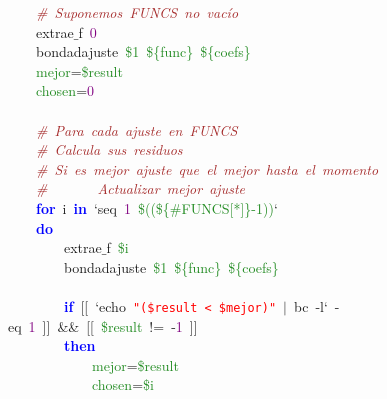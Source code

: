 \mbox{}\ \ \ \ \textit{\textcolor{Brown}{\#\ Suponemos\ FUNCS\ no\ vacío}} \\
\mbox{}\ \ \ \ extrae$\_$f\ \textcolor{Purple}{0} \\
\mbox{}\ \ \ \ bondadajuste\ \textcolor{ForestGreen}{\$1}\ \textcolor{ForestGreen}{\$\{func\}}\ \textcolor{ForestGreen}{\$\{coefs\}} \\
\mbox{}\ \ \ \ \textcolor{ForestGreen}{mejor}\textcolor{BrickRed}{=}\textcolor{ForestGreen}{\$result} \\
\mbox{}\ \ \ \ \textcolor{ForestGreen}{chosen}\textcolor{BrickRed}{=}\textcolor{Purple}{0} \\
\mbox{}\ \ \ \  \\
\mbox{}\ \ \ \ \textit{\textcolor{Brown}{\#\ Para\ cada\ ajuste\ en\ FUNCS}} \\
\mbox{}\ \ \ \ \textit{\textcolor{Brown}{\#\ Calcula\ sus\ residuos}} \\
\mbox{}\ \ \ \ \textit{\textcolor{Brown}{\#\ Si\ es\ mejor\ ajuste\ que\ el\ mejor\ hasta\ el\ momento}} \\
\mbox{}\ \ \ \ \textit{\textcolor{Brown}{\#\ \ \ \ \ \ \ Actualizar\ mejor\ ajuste}} \\
\mbox{}\ \ \ \ \textbf{\textcolor{Blue}{for}}\ i\ \textbf{\textcolor{Blue}{in}}\ `seq\ \textcolor{Purple}{1}\ \textcolor{ForestGreen}{\$((\$\{\#FUNCS[*]\}-1))}` \\
\mbox{}\ \ \ \ \textbf{\textcolor{Blue}{do}} \\
\mbox{}\ \ \ \ \ \ \ \ extrae$\_$f\ \textcolor{ForestGreen}{\$i} \\
\mbox{}\ \ \ \ \ \ \ \ bondadajuste\ \textcolor{ForestGreen}{\$1}\ \textcolor{ForestGreen}{\$\{func\}}\ \textcolor{ForestGreen}{\$\{coefs\}} \\
\mbox{}\ \ \ \ \ \ \ \  \\
\mbox{}\ \ \ \ \ \ \ \ \textbf{\textcolor{Blue}{if}}\ \textcolor{BrickRed}{[[}\ `echo\ \texttt{\textcolor{Red}{"{}(\$result\ \textless{}\ \$mejor)"{}}}\ \textcolor{BrickRed}{$|$}\ bc\ -l`\ -eq\ \textcolor{Purple}{1}\ \textcolor{BrickRed}{]]}\ \textcolor{BrickRed}{\&\&}\ \textcolor{BrickRed}{[[}\ \textcolor{ForestGreen}{\$result}\ \textcolor{BrickRed}{!=}\ -\textcolor{Purple}{1}\ \textcolor{BrickRed}{]]} \\
\mbox{}\ \ \ \ \ \ \ \ \textbf{\textcolor{Blue}{then}} \\
\mbox{}\ \ \ \ \ \ \ \ \ \ \ \ \textcolor{ForestGreen}{mejor}\textcolor{BrickRed}{=}\textcolor{ForestGreen}{\$result} \\
\mbox{}\ \ \ \ \ \ \ \ \ \ \ \ \textcolor{ForestGreen}{chosen}\textcolor{BrickRed}{=}\textcolor{ForestGreen}{\$i} \\
